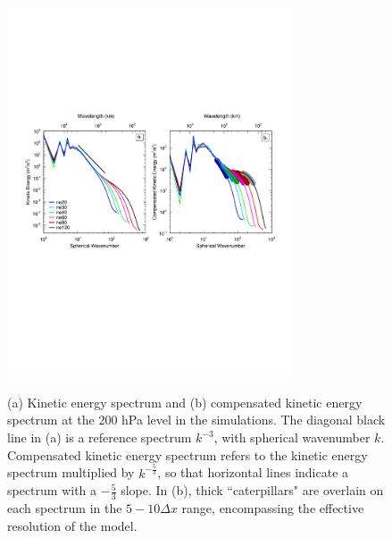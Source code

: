 \documentclass[alpha-refs]{wiley-article}
\begin{document}
\begin{figure}
\begin{center}
\noindent\includegraphics[width=20pc,angle=0]{figs/temp_kespectra.pdf}\\
\end{center}
\caption{(a) Kinetic energy spectrum and (b) compensated kinetic energy spectrum at the 200 hPa level in the simulations. The diagonal black line in (a) is a reference spectrum $k^{-3}$, with spherical wavenumber $k$. Compensated kinetic energy spectrum refers to the kinetic energy spectrum multiplied by $k^{-\frac{5}{3}}$, so that horizontal lines indicate a spectrum with a $-\frac{5}{3}$ slope. In (b), thick ``caterpillars" are overlain on each spectrum in the $5-10 \Delta x$ range, encompassing the effective resolution of the model.}
\label{fig:2ke}
\end{figure}
\end{document}
